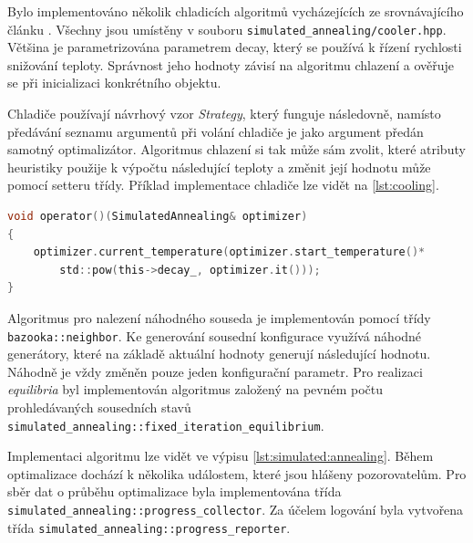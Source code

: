 Bylo implementováno několik chladicích algoritmů vycházejících ze srovnávajícího článku \cite{cooling-comparison}.
Všechny jsou umístěny v souboru \texttt{simulated\_annealing/cooler.hpp}.
Většina je parametrizována parametrem decay, který se používá k řízení rychlosti snižování teploty.
Správnost jeho hodnoty závisí na algoritmu chlazení a ověřuje se při inicializaci konkrétního objektu.

Chladiče používají návrhový vzor \textit{Strategy}, který funguje následovně, namísto předávání seznamu argumentů při volání chladiče je jako argument předán samotný optimalizátor.
Algoritmus chlazení si tak může sám zvolit, které atributy heuristiky použije k výpočtu následující teploty a změnit její hodnotu může pomocí setteru třídy.
Příklad implementace chladiče lze vidět na \ref{lst:cooling}.

\begin{lstlisting}[caption={~Ukázka implementace chlazení třídy \texttt{simulated\_annealing::exp\_mul\_cooler }},label={lst:cooling},captionpos=t,abovecaptionskip=-\medskipamount,belowcaptionskip=\medskipamount,language=C]
void operator()(SimulatedAnnealing& optimizer)
{
    optimizer.current_temperature(optimizer.start_temperature()*
        std::pow(this->decay_, optimizer.it()));
}
\end{lstlisting}

Algoritmus pro nalezení náhodného souseda je implementován pomocí třídy \texttt{bazooka::neighbor}.
Ke generování sousední konfigurace využívá náhodné generátory, které na základě aktuální hodnoty generují následující hodnotu.
Náhodně je vždy změněn pouze jeden konfigurační parametr.
Pro realizaci \textit{equilibria} byl implementován algoritmus založený na pevném počtu prohledávaných sousedních stavů \texttt{simulated\_annealing::fixed\_iteration\_equilibrium}.

Implementaci algoritmu lze vidět ve výpisu \ref{lst:simulated:annealing}.
Během optimalizace dochází k několika událostem, které jsou hlášeny pozorovatelům.
Pro sběr dat o průběhu optimalizace byla implementována třída \texttt{simulated\_annealing::progress\_collector}.
Za účelem logování byla vytvořena třída \texttt{simulated\_annealing::progress\_reporter}.

